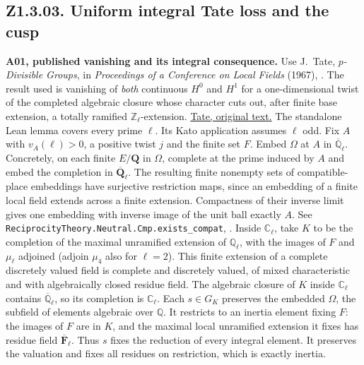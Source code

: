 \subsection{Z1.3.03. Uniform integral Tate loss and the cusp}\label{r7:Z1.3.03}
\textbf{A01, published vanishing and its integral consequence.}
Use J.~Tate, \emph{\(p\)-Divisible Groups}, in \emph{Proceedings of a
Conference on Local Fields} (1967), \cite[\S3.3, Theorem~2, p.~176]{Tate-pdiv}. The result used is
vanishing of \emph{both} continuous \(H^0\) and \(H^1\) for a
one-dimensional twist of the completed algebraic closure whose character
cuts out, after finite base extension, a totally ramified
\(\mathbb Z_\ell\)-extension.
\href{https://www.math.purdue.edu/~tongliu/teaching/598/p-divisible.pdf}{Tate, original text.}
The standalone Lean lemma covers every prime \(\ell\). Its Kato application assumes \(\ell\) odd. Fix \(A\) with \(v_A(\ell)>0\), a positive twist \(j\) and the finite set \(F\). Embed
\(\Omega\) at \(A\) in \(\overline{\mathbb Q}_\ell\). Concretely, on each finite \(E/\mathbf Q\) in \(\Omega\), complete at the prime induced by \(A\) and embed the completion in \(\overline{\mathbf Q}_\ell\). The resulting finite nonempty sets of compatible-place embeddings have surjective restriction maps, since an embedding of a finite local field extends across a finite extension. Compactness of their inverse limit gives one embedding with inverse image of the unit ball exactly \(A\). See \nolinkurl{ReciprocityTheory.Neutral.Cmp.exists_compat}, . Inside
\(\mathbb C_\ell\), take \(K\) to be the completion of the maximal
unramified extension of \(\mathbb Q_\ell\), with the images of \(F\) and
\(\mu_\ell\) adjoined (adjoin \(\mu_4\) also for \(\ell=2\)).
This finite extension of a complete discretely valued field is complete
and discretely valued, of mixed characteristic and with algebraically
closed residue field. The algebraic closure of \(K\) inside
\(\mathbb C_\ell\) contains \(\overline{\mathbb Q}_\ell\), so its
completion is \(\mathbb C_\ell\).
Each \(s\in G_K\) preserves the embedded \(\Omega\), the subfield
of elements algebraic over \(\mathbb Q\). It restricts to an inertia
element fixing \(F\): the images of \(F\) are in \(K\), and the maximal local unramified extension it fixes has residue field \(\overline{\mathbf F}_\ell\). Thus \(s\) fixes the reduction of every integral element. It preserves the valuation and fixes all residues on restriction, which is exactly inertia.
